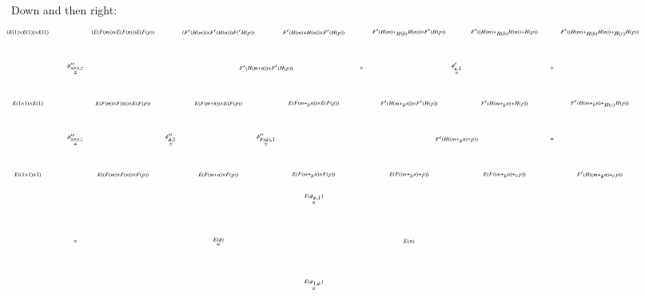 \documentclass[reqno]{amsart}
\begin{document}
Down and then right:
\[
\hspace{-.8in}
\begin{tikzpicture}[scale=1.5]
\node (1) at (1,1.05) {$\scriptscriptstyle{\stackrel{\phi''_{x \times y,z}} \cong}$};
\node (2) at (7,1.05) {$\scriptscriptstyle{\cong}$};
\node (3) at (9,1.05) {$\scriptscriptstyle{\stackrel{\phi'_{\kappa,1}} \cong}$};
\node (3) at (11,1.05) {$\scriptscriptstyle{\cong}$};
\node (4) at (1,-.45) {$\scriptscriptstyle{\stackrel{\phi''_{x \times y,z}} \cong}$};
\node (5) at (3,-.45) {$\scriptscriptstyle{\stackrel{\phi''_{\phi,1}} \cong}$};
\node (6) at (5,-.45) {$\scriptscriptstyle{\stackrel{\phi''_{F(\psi),1}} \cong}$};
\node (7) at (11,-.45) {$\scriptscriptstyle{\cong}$};
\node (8) at (1,-2.6) {$\scriptscriptstyle{\cong}$};
\node (9) at (4,-2.6) {$\scriptscriptstyle{\stackrel{E(\phi)}\cong}$};
\node (10) at (8,-2.6) {$\scriptscriptstyle{E(\cong)}$};
\node (11) at (6,-1.7) {$\scriptscriptstyle{\stackrel{E(\phi_{\psi,1})}\cong}$};
\node (12) at (6,-3.5) {$\scriptscriptstyle{\stackrel{E(\phi_{1,\psi})}\cong}$};

\node (A1) at (0,1.8) {$\scriptscriptstyle{(E(1) \times  E(1)) \times E(1)}$};
\node (A2) at (2,1.8) {$\scriptscriptstyle{(E(F(m)) \times E(F(n))) E(F(p))}$};
\node (A3) at (4,1.8) {$\scriptscriptstyle{(F'(H(m)) \times F'(H(n))) F('H(p))}$};
\node (A4) at (6,1.8) {$\scriptscriptstyle{F'(H(m) + H(n)) \times F'(H(p))}$};
\node (A5) at (8,1.8) {$\scriptscriptstyle{F'(H(m)+_{H(b)} H(n)) \times F'(H(p))}$};
\node (A6) at (10,1.8) {$\scriptscriptstyle{F'((H(m)+_{H(b)} H(n)) + H(p)) }$};
\node (A7) at (12,1.8) {$\scriptscriptstyle{F'((H(m)+_{H(b)} H(n))+_{H(c)} H(p))}$};

\node (A') at (5,1.05) {$\scriptscriptstyle{F'(H(m+n)) \times F'(H(p))}$};

\node (B1) at (0,0.3) {$\scriptscriptstyle{E(1 \times 1) \times E(1)}$};
\node (B2) at (2,0.3) {$\scriptscriptstyle{E(F(m) \times F(n)) \times E(F(p))}$};
\node (B3) at (4,0.3) {$\scriptscriptstyle{E(F(m+n)) \times E(F(p))}$};
\node (B4) at (6,0.3) {$\scriptscriptstyle{E(F(m+_b n)) \times E(F(p))}$};
\node (B5) at (8,0.3) {$\scriptscriptstyle{F'(H(m+_b n)) \times F'(H(p))}$};
\node (B6) at (10,0.3) {$\scriptscriptstyle{F'(H(m+_b n)+H(p))}$};
\node (B7) at (12,0.3) {$\scriptscriptstyle{F'(H(m+_b n)+_{H(c)} H(p))}$};

\node (B') at (9,-.45) {$\scriptscriptstyle{F'(H((m+_b n)+p))}$};

\node (C1) at (0,-1.2) {$\scriptscriptstyle{E((1 \times 1) \times 1)}$};
\node (C2) at (2,-1.2) {$\scriptscriptstyle{E((F(m) \times F(n)) \times F(p))}$};
\node (C3) at (4,-1.2) {$\scriptscriptstyle{E(F(m+n) \times F(p))}$};
\node (C4) at (6,-1.2) {$\scriptscriptstyle{E(F(m+_b n) \times F(p))}$};
\node (C5) at (8,-1.2) {$\scriptscriptstyle{E(F((m+_b n)+p))}$};
\node (C6) at (10,-1.2) {$\scriptscriptstyle{E(F((m+_b n)+_c p))}$};
\node (C7) at (12,-1.2) {$\scriptscriptstyle{F'(H((m+_b n)+_c p))}$};


\end{tikzpicture}\]
\end{document}
